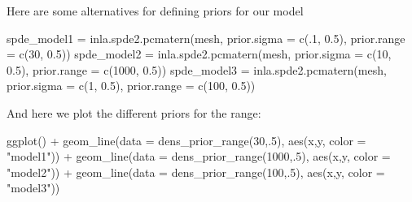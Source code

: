 \documentclass[
  letterpaper,
  DIV=11,
  numbers=noendperiod]{scrartcl}
\newenvironment{Shaded}{\begin{snugshade}}{\end{snugshade}}
\newcommand{\AttributeTok}[1]{\textcolor[rgb]{0.40,0.45,0.13}{#1}}
\newcommand{\DecValTok}[1]{\textcolor[rgb]{0.68,0.00,0.00}{#1}}
\newcommand{\FloatTok}[1]{\textcolor[rgb]{0.68,0.00,0.00}{#1}}
\newcommand{\FunctionTok}[1]{\textcolor[rgb]{0.28,0.35,0.67}{#1}}
\newcommand{\NormalTok}[1]{\textcolor[rgb]{0.00,0.23,0.31}{#1}}
\newcommand{\OtherTok}[1]{\textcolor[rgb]{0.00,0.23,0.31}{#1}}
\newcommand{\SpecialCharTok}[1]{\textcolor[rgb]{0.37,0.37,0.37}{#1}}
\newcommand{\StringTok}[1]{\textcolor[rgb]{0.13,0.47,0.30}{#1}}
\begin{document}
Here are some alternatives for defining priors for our model

\begin{Shaded}
\begin{Highlighting}[]
\NormalTok{spde\_model1 }\OtherTok{=}  \FunctionTok{inla.spde2.pcmatern}\NormalTok{(mesh,}
                                  \AttributeTok{prior.sigma =} \FunctionTok{c}\NormalTok{(.}\DecValTok{1}\NormalTok{, }\FloatTok{0.5}\NormalTok{),}
                                  \AttributeTok{prior.range =} \FunctionTok{c}\NormalTok{(}\DecValTok{30}\NormalTok{, }\FloatTok{0.5}\NormalTok{))}
\NormalTok{spde\_model2 }\OtherTok{=}  \FunctionTok{inla.spde2.pcmatern}\NormalTok{(mesh,}
                                  \AttributeTok{prior.sigma =} \FunctionTok{c}\NormalTok{(}\DecValTok{10}\NormalTok{, }\FloatTok{0.5}\NormalTok{),}
                                  \AttributeTok{prior.range =} \FunctionTok{c}\NormalTok{(}\DecValTok{1000}\NormalTok{, }\FloatTok{0.5}\NormalTok{))}
\NormalTok{spde\_model3 }\OtherTok{=}  \FunctionTok{inla.spde2.pcmatern}\NormalTok{(mesh,}
                                  \AttributeTok{prior.sigma =} \FunctionTok{c}\NormalTok{(}\DecValTok{1}\NormalTok{, }\FloatTok{0.5}\NormalTok{),}
                                  \AttributeTok{prior.range =} \FunctionTok{c}\NormalTok{(}\DecValTok{100}\NormalTok{, }\FloatTok{0.5}\NormalTok{))}
\end{Highlighting}
\end{Shaded}

And here we plot the different priors for the range:

\begin{Shaded}
\begin{Highlighting}[]
\FunctionTok{ggplot}\NormalTok{() }\SpecialCharTok{+} \FunctionTok{geom\_line}\NormalTok{(}\AttributeTok{data =} \FunctionTok{dens\_prior\_range}\NormalTok{(}\DecValTok{30}\NormalTok{,.}\DecValTok{5}\NormalTok{), }\FunctionTok{aes}\NormalTok{(x,y, }\AttributeTok{color =} \StringTok{"model1"}\NormalTok{)) }\SpecialCharTok{+}
\FunctionTok{geom\_line}\NormalTok{(}\AttributeTok{data =} \FunctionTok{dens\_prior\_range}\NormalTok{(}\DecValTok{1000}\NormalTok{,.}\DecValTok{5}\NormalTok{), }\FunctionTok{aes}\NormalTok{(x,y, }\AttributeTok{color =} \StringTok{"model2"}\NormalTok{)) }\SpecialCharTok{+}
\FunctionTok{geom\_line}\NormalTok{(}\AttributeTok{data =} \FunctionTok{dens\_prior\_range}\NormalTok{(}\DecValTok{100}\NormalTok{,.}\DecValTok{5}\NormalTok{), }\FunctionTok{aes}\NormalTok{(x,y, }\AttributeTok{color =} \StringTok{"model3"}\NormalTok{)) }
\end{Highlighting}
\end{Shaded}
\end{document}
